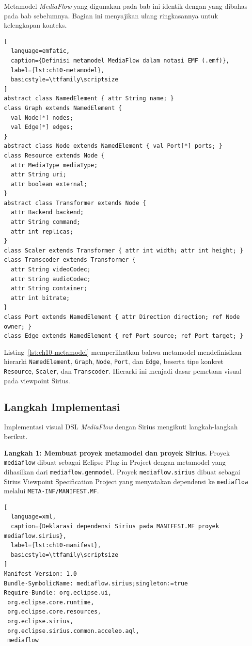 Metamodel \textit{MediaFlow} yang digunakan pada bab ini identik dengan yang dibahas pada bab sebelumnya. Bagian ini menyajikan ulang ringkasannya untuk kelengkapan konteks.

\begin{lstlisting}[
  language=emfatic,
  caption={Definisi metamodel MediaFlow dalam notasi EMF (.emf)},
  label={lst:ch10-metamodel},
  basicstyle=\ttfamily\scriptsize
]
abstract class NamedElement { attr String name; }
class Graph extends NamedElement {
  val Node[*] nodes;
  val Edge[*] edges;
}
abstract class Node extends NamedElement { val Port[*] ports; }
class Resource extends Node {
  attr MediaType mediaType;
  attr String uri;
  attr boolean external;
}
abstract class Transformer extends Node {
  attr Backend backend;
  attr String command;
  attr int replicas;
}
class Scaler extends Transformer { attr int width; attr int height; }
class Transcoder extends Transformer {
  attr String videoCodec;
  attr String audioCodec;
  attr String container;
  attr int bitrate;
}
class Port extends NamedElement { attr Direction direction; ref Node owner; }
class Edge extends NamedElement { ref Port source; ref Port target; }
\end{lstlisting}

\noindent Listing~\ref{lst:ch10-metamodel} memperlihatkan bahwa metamodel mendefinisikan hierarki \texttt{NamedElement}, \texttt{Graph}, \texttt{Node}, \texttt{Port}, dan \texttt{Edge}, beserta tipe konkret \texttt{Resource}, \texttt{Scaler}, dan \texttt{Transcoder}. Hierarki ini menjadi dasar pemetaan visual pada viewpoint Sirius.

\subsection{Langkah Implementasi}

Implementasi visual DSL \textit{MediaFlow} dengan Sirius mengikuti langkah-langkah berikut.

\textbf{Langkah 1: Membuat proyek metamodel dan proyek Sirius.} Proyek \texttt{mediaflow} dibuat sebagai Eclipse Plug-in Project dengan metamodel yang dihasilkan dari \texttt{mediaflow.genmodel}. Proyek \texttt{mediaflow.sirius} dibuat sebagai Sirius Viewpoint Specification Project yang menyatakan dependensi ke \texttt{mediaflow} melalui \texttt{META-INF/MANIFEST.MF}.

\begin{lstlisting}[
  language=xml,
  caption={Deklarasi dependensi Sirius pada MANIFEST.MF proyek mediaflow.sirius},
  label={lst:ch10-manifest},
  basicstyle=\ttfamily\scriptsize
]
Manifest-Version: 1.0
Bundle-SymbolicName: mediaflow.sirius;singleton:=true
Require-Bundle: org.eclipse.ui,
 org.eclipse.core.runtime,
 org.eclipse.core.resources,
 org.eclipse.sirius,
 org.eclipse.sirius.common.acceleo.aql,
 mediaflow
\end{lstlisting}

